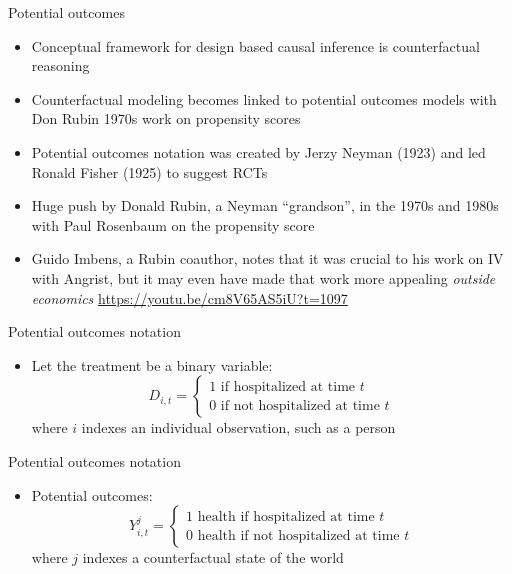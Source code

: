 \documentclass{beamer}
\begin{document}
\begin{frame}{Potential outcomes}

\begin{itemize}
\item Conceptual framework for design based causal inference is counterfactual reasoning
\item Counterfactual modeling becomes linked to potential outcomes models with Don Rubin 1970s work on propensity scores
\item Potential outcomes notation was created by Jerzy Neyman (1923) and led Ronald Fisher (1925) to suggest RCTs
\item Huge push by Donald Rubin, a Neyman ``grandson'', in the 1970s and 1980s with Paul Rosenbaum on the propensity score
\item Guido Imbens, a Rubin coauthor, notes that it was crucial to his work on IV with Angrist, but it may even have made that work more appealing \emph{outside economics}
\url{https://youtu.be/cm8V65AS5iU?t=1097}

\end{itemize}

\end{frame}




\begin{frame}{Potential outcomes notation}

  \begin{itemize}
    \item Let the treatment be a binary variable: $$D_{i,t} =\begin{cases} 1 \text{ if hospitalized at time $t$} \\ 0 \text{ if not hospitalized at time $t$} \end{cases}$$where $i$ indexes an individual observation, such as a person
  \end{itemize}
\end{frame}

\begin{frame}{Potential outcomes notation}

  \begin{itemize}
    \item Potential outcomes: $$Y_{i,t}^j =\begin{cases} 1 \text{ health if hospitalized at time $t$} \\ 0 \text{ health if not hospitalized at time $t$} \end{cases}$$where $j$ indexes a counterfactual state of the world
  \end{itemize}
\end{frame}
\end{document}
